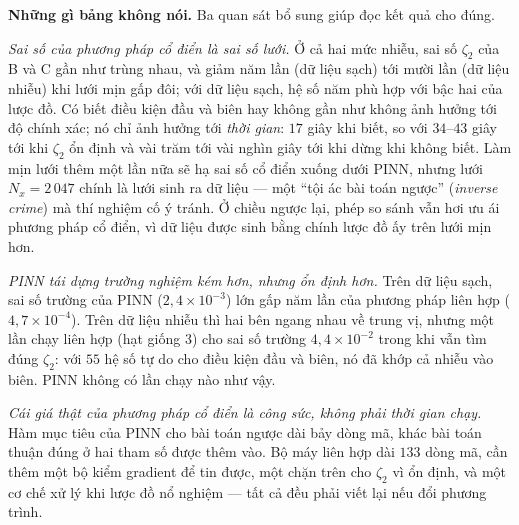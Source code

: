 \textbf{Những gì bảng không nói.} Ba quan sát bổ sung giúp đọc kết quả cho đúng.

\emph{Sai số của phương pháp cổ điển là sai số lưới.} Ở cả hai mức nhiễu, sai số
$\zeta_2$ của B và C gần như trùng nhau, và giảm năm lần (dữ liệu sạch) tới mười
lần (dữ liệu nhiễu) khi lưới mịn gấp đôi; với dữ liệu sạch, hệ số năm phù hợp
với bậc hai của lược đồ. Có biết điều kiện đầu và biên hay không gần như
không ảnh hưởng tới độ chính xác; nó chỉ ảnh hưởng tới \emph{thời gian}: $17$
giây khi biết, so với $34$--$43$ giây tới khi $\zeta_2$ ổn định và vài trăm tới
vài nghìn giây tới khi dừng khi không biết. Làm mịn lưới thêm một lần nữa sẽ hạ
sai số cổ điển xuống dưới PINN, nhưng lưới $N_x = 2\,047$ chính là lưới sinh ra
dữ liệu --- một ``tội ác bài toán ngược'' (\emph{inverse crime}) mà thí nghiệm cố
ý tránh. Ở chiều ngược lại, phép so sánh vẫn hơi ưu ái phương pháp cổ điển, vì
dữ liệu được sinh bằng chính lược đồ ấy trên lưới mịn hơn.

\emph{PINN tái dựng trường nghiệm kém hơn, nhưng ổn định hơn.} Trên dữ liệu sạch,
sai số trường của PINN ($2{,}4\times10^{-3}$) lớn gấp năm lần của phương pháp
liên hợp ($4{,}7\times10^{-4}$). Trên dữ liệu nhiễu thì hai bên ngang nhau về
trung vị, nhưng một lần chạy liên hợp (hạt giống $3$) cho sai số trường
$4{,}4\times10^{-2}$ trong khi vẫn tìm đúng $\zeta_2$: với $55$ hệ số tự do cho
điều kiện đầu và biên, nó đã khớp cả nhiễu vào biên. PINN không có lần chạy nào
như vậy.

\emph{Cái giá thật của phương pháp cổ điển là công sức, không phải thời gian
chạy.} Hàm mục tiêu của PINN cho bài toán ngược dài bảy dòng mã, khác bài toán
thuận đúng ở hai tham số được thêm vào. Bộ máy liên hợp dài $133$ dòng mã, cần
thêm một bộ kiểm gradient để tin được, một chặn trên cho $\zeta_2$ vì ổn định, và
một cơ chế xử lý khi lược đồ nổ nghiệm --- tất cả đều phải viết lại nếu đổi
phương trình.


